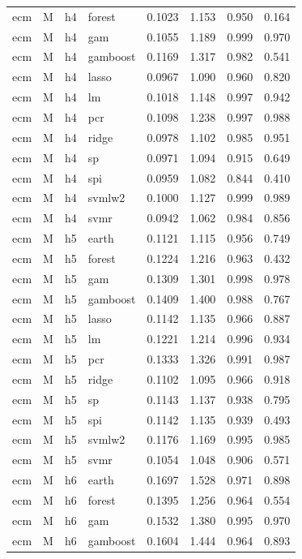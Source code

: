 \begin{ThreePartTable}
\begin{longtable}[t]{llclcccc}
ecm & M & h4 & forest & 0.1023 & 1.153 & 0.950 & 0.164\\
ecm & M & h4 & gam & 0.1055 & 1.189 & 0.999 & 0.970\\
ecm & M & h4 & gamboost & 0.1169 & 1.317 & 0.982 & 0.541\\
ecm & M & h4 & lasso & 0.0967 & 1.090 & 0.960 & 0.820\\
ecm & M & h4 & lm & 0.1018 & 1.148 & 0.997 & 0.942\\
ecm & M & h4 & pcr & 0.1098 & 1.238 & 0.997 & 0.988\\
ecm & M & h4 & ridge & 0.0978 & 1.102 & 0.985 & 0.951\\
ecm & M & h4 & sp & 0.0971 & 1.094 & 0.915 & 0.649\\
ecm & M & h4 & spi & 0.0959 & 1.082 & 0.844 & 0.410\\
ecm & M & h4 & svmlw2 & 0.1000 & 1.127 & 0.999 & 0.989\\
ecm & M & h4 & svmr & 0.0942 & 1.062 & 0.984 & 0.856\\
\addlinespace
ecm & M & h5 & earth & 0.1121 & 1.115 & 0.956 & 0.749\\
ecm & M & h5 & forest & 0.1224 & 1.216 & 0.963 & 0.432\\
ecm & M & h5 & gam & 0.1309 & 1.301 & 0.998 & 0.978\\
ecm & M & h5 & gamboost & 0.1409 & 1.400 & 0.988 & 0.767\\
ecm & M & h5 & lasso & 0.1142 & 1.135 & 0.966 & 0.887\\
ecm & M & h5 & lm & 0.1221 & 1.214 & 0.996 & 0.934\\
ecm & M & h5 & pcr & 0.1333 & 1.326 & 0.991 & 0.987\\
ecm & M & h5 & ridge & 0.1102 & 1.095 & 0.966 & 0.918\\
ecm & M & h5 & sp & 0.1143 & 1.137 & 0.938 & 0.795\\
ecm & M & h5 & spi & 0.1142 & 1.135 & 0.939 & 0.493\\
ecm & M & h5 & svmlw2 & 0.1176 & 1.169 & 0.995 & 0.985\\
ecm & M & h5 & svmr & 0.1054 & 1.048 & 0.906 & 0.571\\
\addlinespace
ecm & M & h6 & earth & 0.1697 & 1.528 & 0.971 & 0.898\\
ecm & M & h6 & forest & 0.1395 & 1.256 & 0.964 & 0.554\\
ecm & M & h6 & gam & 0.1532 & 1.380 & 0.995 & 0.970\\
ecm & M & h6 & gamboost & 0.1604 & 1.444 & 0.964 & 0.893\\

\end{longtable}
\end{ThreePartTable}
